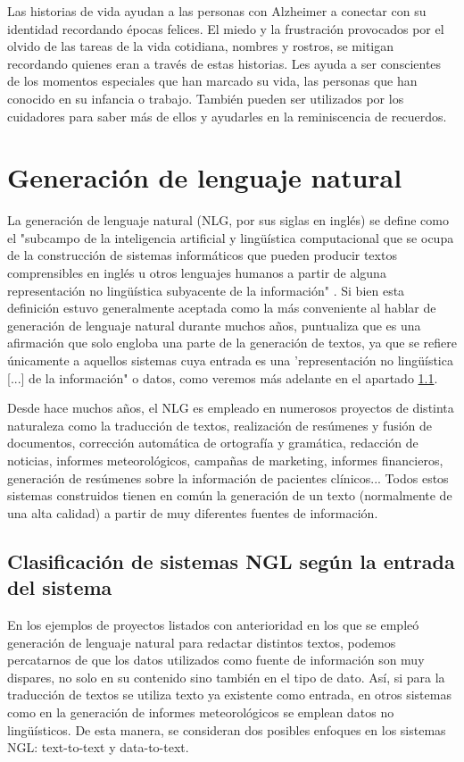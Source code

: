 Las historias de vida ayudan a las personas con Alzheimer a conectar con su identidad recordando épocas felices. El miedo y la frustración provocados por el olvido de las tareas de la vida cotidiana, nombres y rostros, se mitigan recordando quienes eran a través de estas historias. Les ayuda a ser conscientes de los momentos especiales que han marcado su vida, las personas que han conocido en su infancia o trabajo. También pueden ser utilizados por los cuidadores para saber más de ellos y ayudarles en la reminiscencia de recuerdos. \citep{karlsson2014stories}



\section{Generación de lenguaje natural}

La generación de lenguaje natural (NLG, por sus siglas en inglés) se define como el "subcampo de la inteligencia artificial y lingüística computacional que se ocupa de la construcción de sistemas informáticos que pueden producir textos comprensibles en inglés u otros lenguajes humanos a partir de alguna representación no lingüística subyacente de la información"  \citep{reiter1997building}. Si bien esta definición estuvo generalmente aceptada como la más conveniente al hablar de generación de lenguaje natural durante muchos años, \cite{gatt2018survey} puntualiza que es una afirmación que solo engloba una parte de la generación de textos, ya que se refiere 
únicamente a aquellos sistemas cuya entrada es una 'representación no lingüística [...] de la información" o datos, como veremos más adelante en el apartado \ref{cap:ngltipos}.

 Desde hace muchos años, el NLG es empleado en numerosos proyectos de distinta naturaleza como la traducción de textos, realización de resúmenes y fusión de documentos, corrección automática de ortografía y gramática, redacción de noticias, informes meteorológicos, campañas de marketing, informes financieros, generación de resúmenes sobre la información de pacientes clínicos... Todos estos sistemas construidos tienen en común la generación de un texto (normalmente de una alta calidad) a partir de muy diferentes fuentes de información. 

\subsection{Clasificación de sistemas NGL según la entrada del sistema}\label{cap:ngltipos}
En los ejemplos de proyectos listados con anterioridad en los que se empleó generación de lenguaje natural para redactar distintos textos, podemos percatarnos de que los datos utilizados como fuente de información son muy dispares, no solo en su contenido sino también en el tipo de dato. Así, si para la traducción de textos se utiliza texto ya existente como entrada, en otros sistemas como en la generación de informes meteorológicos se emplean datos no lingüísticos. De esta manera, se consideran dos posibles enfoques en los sistemas NGL: text-to-text y data-to-text.


